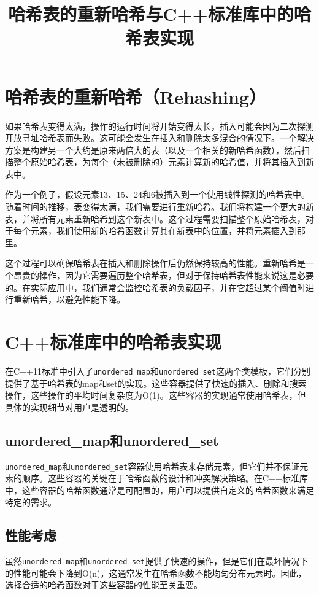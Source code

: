 \documentclass[12pt]{article}
\title{哈希表的重新哈希与C++标准库中的哈希表实现}
\author{}
\date{}
\begin{document}
\maketitle

\section{哈希表的重新哈希（Rehashing）}
如果哈希表变得太满，操作的运行时间将开始变得太长，插入可能会因为二次探测开放寻址哈希表而失败。这可能会发生在插入和删除太多混合的情况下。一个解决方案是构建另一个大约是原来两倍大的表（以及一个相关的新哈希函数），然后扫描整个原始哈希表，为每个（未被删除的）元素计算新的哈希值，并将其插入到新表中。

作为一个例子，假设元素13、15、24和6被插入到一个使用线性探测的哈希表中。随着时间的推移，表变得太满，我们需要进行重新哈希。我们将构建一个更大的新表，并将所有元素重新哈希到这个新表中。这个过程需要扫描整个原始哈希表，对于每个元素，我们使用新的哈希函数计算其在新表中的位置，并将元素插入到那里。

这个过程可以确保哈希表在插入和删除操作后仍然保持较高的性能。重新哈希是一个昂贵的操作，因为它需要遍历整个哈希表，但对于保持哈希表性能来说这是必要的。在实际应用中，我们通常会监控哈希表的负载因子，并在它超过某个阈值时进行重新哈希，以避免性能下降。

\section{C++标准库中的哈希表实现}
在C++11标准中引入了\texttt{unordered\_map}和\texttt{unordered\_set}这两个类模板，它们分别提供了基于哈希表的map和set的实现。这些容器提供了快速的插入、删除和搜索操作，这些操作的平均时间复杂度为O(1)。这些容器的实现通常使用哈希表，但具体的实现细节对用户是透明的。

\subsection{unordered\_map和unordered\_set}
\texttt{unordered\_map}和\texttt{unordered\_set}容器使用哈希表来存储元素，但它们并不保证元素的顺序。这些容器的关键在于哈希函数的设计和冲突解决策略。在C++标准库中，这些容器的哈希函数通常是可配置的，用户可以提供自定义的哈希函数来满足特定的需求。

\subsection{性能考虑}
虽然\texttt{unordered\_map}和\texttt{unordered\_set}提供了快速的操作，但是它们在最坏情况下的性能可能会下降到O(n)，这通常发生在哈希函数不能均匀分布元素时。因此，选择合适的哈希函数对于这些容器的性能至关重要。
\end{document}
